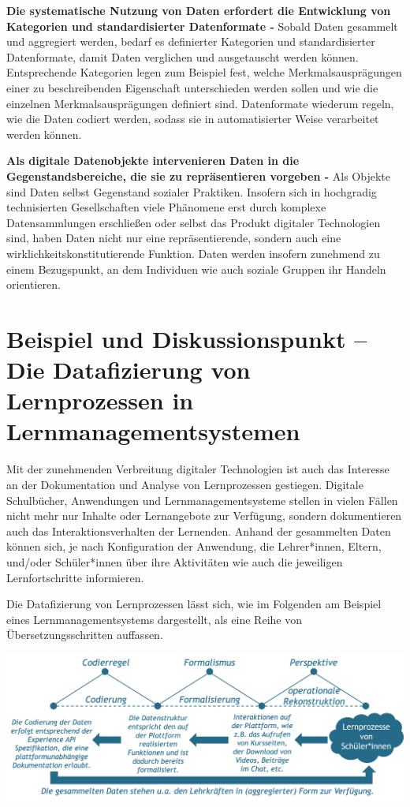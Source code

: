 \documentclass[
  a4paper,
]{book}
\begin{document}
\textbf{Die systematische Nutzung von Daten erfordert die Entwicklung von Kategorien und standardisierter Datenformate -} Sobald Daten gesammelt und aggregiert werden, bedarf es definierter Kategorien und standardisierter Datenformate, damit Daten verglichen und ausgetauscht werden können. Entsprechende Kategorien legen zum Beispiel fest, welche Merkmalsausprägungen einer zu beschreibenden Eigenschaft unterschieden werden sollen und wie die einzelnen Merkmalsausprägungen definiert sind. Datenformate wiederum regeln, wie die Daten codiert werden, sodass sie in automatisierter Weise verarbeitet werden können.

\textbf{Als digitale Datenobjekte intervenieren Daten in die Gegenstandsbereiche, die sie zu repräsentieren vorgeben -} Als Objekte sind Daten selbst Gegenstand sozialer Praktiken. Insofern sich in hochgradig technisierten Gesellschaften viele Phänomene erst durch komplexe Datensammlungen erschließen oder selbst das Produkt digitaler Technologien sind, haben Daten nicht nur eine repräsentierende, sondern auch eine wirklichkeitskonstitutierende Funktion. Daten werden insofern zunehmend zu einem Bezugspunkt, an dem Individuen wie auch soziale Gruppen ihr Handeln orientieren.

\section{Beispiel und Diskussionspunkt -- Die Datafizierung von Lernprozessen in Lernmanagementsystemen}\label{beispiel-und-diskussionspunkt-die-datafizierung-von-lernprozessen-in-lernmanagementsystemen}

Mit der zunehmenden Verbreitung digitaler Technologien ist auch das Interesse an der Dokumentation und Analyse von Lernprozessen gestiegen. Digitale Schulbücher, Anwendungen und Lernmanagementsysteme stellen in vielen Fällen nicht mehr nur Inhalte oder Lernangebote zur Verfügung, sondern dokumentieren auch das Interaktionsverhalten der Lernenden. Anhand der gesammelten Daten können sich, je nach Konfiguration der Anwendung, die Lehrer*innen, Eltern, und/oder Schüler*innen über ihre Aktivitäten wie auch die jeweiligen Lernfortschritte informieren.

Die Datafizierung von Lernprozessen lässt sich, wie im Folgenden am Beispiel eines Lernmanagementsystems dargestellt, als eine Reihe von Übersetzungsschritten auffassen.

\begin{center}\includegraphics{Figures/10-04-Lernmanagementsystem} \end{center}
\end{document}
